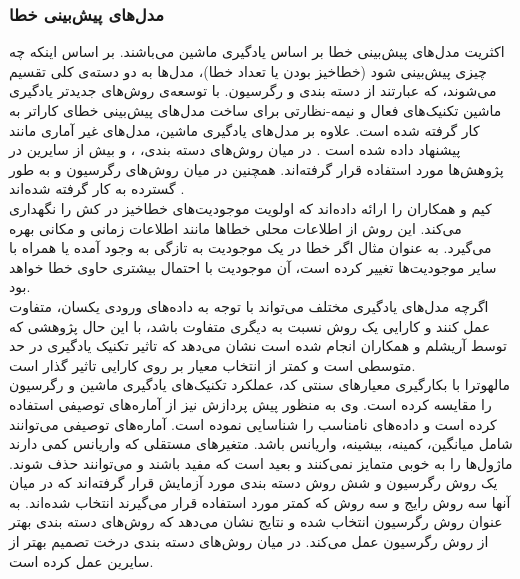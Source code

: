 
\subsubsection{مدل‌های پیش‌بینی خطا}
اکثریت مدل‌های پیش‌بینی خطا بر اساس یادگیری ماشین می‌باشند. بر اساس اینکه چه چیزی پیش‌بینی شود (خطاخیز بودن یا تعداد خطا)، مدل‌ها به دو دسته‌ی کلی تقسیم می‌شوند، که عبارتند از دسته بندی و رگرسیون. با توسعه‌ی روش‌های جدیدتر یادگیری ماشین تکنیک‌های فعال و نیمه-نظارتی برای ساخت مدل‌های پیش‌بینی خطای کاراتر به کار گرفته شده است\cite{li2012sample}. علاوه بر مدل‌های یادگیری ماشین، مدل‌های غیر آماری مانند  پیشنهاد داده شده است \cite{kim2007predicting}. در میان روش‌های دسته بندی، 
 ،
 و
بیش از سایرین در پژوهش‌ها مورد استفاده قرار گرفته‌اند. همچنین در میان روش‌های رگرسیون 
 و 
به طور گسترده به کار گرفته شده‌اند \cite{nam2014survey}. \\
کیم و همکاران  را ارائه داده‌اند که  اولویت موجودیت‌های خطاخیز در کش  را نگهداری  می‌کند. این روش از اطلاعات محلی خطاها مانند اطلاعات زمانی و مکانی بهره می‌گیرد. به عنوان مثال اگر خطا در یک موجودیت به تازگی به وجود آمده یا همراه با سایر موجودیت‌ها تغییر کرده است، آن موجودیت با احتمال بیشتری حاوی خطا خواهد بود.\\
اگرچه مدل‌های یادگیری مختلف می‌تواند  با توجه به داده‌های ورودی یکسان، متفاوت عمل کنند و کارایی یک روش نسبت به دیگری متفاوت باشد، با این حال پژوهشی که توسط آریشلم  و همکاران  \cite{arisholm2010systematic} انجام شده است نشان می‌دهد که تاثیر  تکنیک یادگیری در حد متوسطی است و کمتر از انتخاب معیار بر روی کارایی تاثیر گذار است.  \\

مالهوترا با بکارگیری معیارهای سنتی کد، عملکرد تکنیک‌های یادگیری ماشین و رگرسیون را مقایسه کرده است\cite{malhotra2014comparative}. وی به منظور پیش پردازش نیز از آماره‌های توصیفی  استفاده کرده است و داده‌های نامناسب را شناسایی نموده است. آماره‌های توصیفی می‌توانند شامل میانگین، کمینه، بیشینه، واریانس باشد. متغیرهای مستقلی که  واریانس کمی دارند ماژول‌ها را به خوبی متمایز نمی‌کنند و بعید است که مفید باشند و می‌توانند حذف شوند. یک روش رگرسیون و شش روش دسته بندی مورد آزمایش قرار گرفته‌اند که در میان آنها سه روش رایج و سه روش که کمتر مورد استفاده قرار می‌گیرند انتخاب شده‌اند.  به عنوان روش رگرسیون انتخاب شده و نتایج نشان می‌دهد که روش‌های دسته بندی بهتر از روش رگرسیون عمل می‌کند. در میان روش‌های دسته بندی درخت تصمیم  بهتر از سایرین عمل کرده است. 


